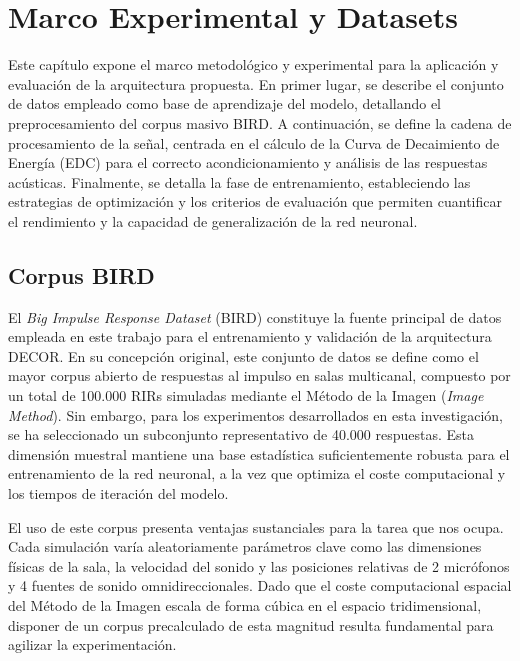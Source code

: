 
\chapter{Marco Experimental y Datasets}

Este capítulo expone el marco metodológico y experimental  para la aplicación y evaluación de la arquitectura propuesta. En primer lugar, se describe el conjunto de datos empleado como base de aprendizaje del modelo, detallando el preprocesamiento del corpus masivo BIRD. A continuación, se define la cadena de procesamiento de la señal, centrada en el cálculo de la Curva de Decaimiento de Energía (EDC) para el correcto acondicionamiento y análisis de las respuestas acústicas. Finalmente, se detalla la fase de entrenamiento, estableciendo las estrategias de optimización y los criterios de evaluación que permiten cuantificar el rendimiento y la capacidad de generalización de la red neuronal.

\section{Corpus BIRD}

El \textit{Big Impulse Response Dataset} (BIRD) \cite{Grondin25} constituye la fuente principal de datos empleada en este trabajo para el entrenamiento y validación de la arquitectura DECOR. En su concepción original, este conjunto de datos se define como el mayor corpus abierto de respuestas al impulso en salas multicanal, compuesto por un total de 100.000 RIRs simuladas mediante el Método de la Imagen (\textit{Image Method}). Sin embargo, para los experimentos desarrollados en esta investigación, se ha seleccionado un subconjunto representativo de 40.000 respuestas. Esta dimensión muestral mantiene una base estadística suficientemente robusta para el entrenamiento de la red neuronal, a la vez que optimiza el coste computacional y los tiempos de iteración del modelo. 

El uso de este corpus presenta ventajas sustanciales para la tarea que nos ocupa. Cada simulación varía aleatoriamente parámetros clave como las dimensiones físicas de la sala, la velocidad del sonido y las posiciones relativas de 2 micrófonos y 4 fuentes de sonido omnidireccionales. Dado que el coste computacional espacial del Método de la Imagen escala de forma cúbica en el espacio tridimensional, disponer de un corpus precalculado de esta magnitud resulta fundamental para agilizar la experimentación.

